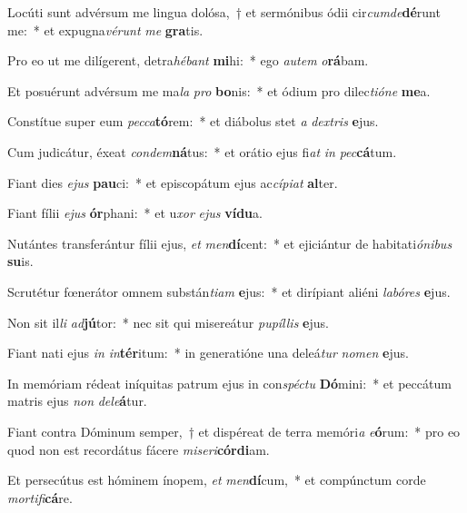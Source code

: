 \item Locúti sunt advérsum me lingua dolósa,~† et sermónibus ódii cir\textit{cum}\textit{de}\textbf{dé}runt me:~* et expugna\textit{vé}\textit{runt} \textit{me} \textbf{gra}tis.
\item Pro eo ut me dilígerent, detra\textit{hé}\textit{bant} \textbf{mi}hi:~* ego \textit{au}\textit{tem} \textit{o}\textbf{rá}bam.
\item Et posuérunt advérsum me ma\textit{la} \textit{pro} \textbf{bo}nis:~* et ódium pro dilec\textit{ti}\textit{ó}\textit{ne} \textbf{me}a.
\item Constítue super eum \textit{pec}\textit{ca}\textbf{tó}rem:~* et diábolus stet \textit{a} \textit{dex}\textit{tris} \textbf{e}jus.
\item Cum judicátur, éxeat \textit{con}\textit{dem}\textbf{ná}tus:~* et orátio ejus fi\textit{at} \textit{in} \textit{pec}\textbf{cá}tum.
\item Fiant dies \textit{e}\textit{jus} \textbf{pau}ci:~* et episcopátum ejus ac\textit{cí}\textit{pi}\textit{at} \textbf{al}ter.
\item Fiant fílii \textit{e}\textit{jus} \textbf{ór}phani:~* et u\textit{xor} \textit{e}\textit{jus} \textbf{ví}\textbf{du}a.
\item Nutántes transferántur fílii ejus, \textit{et} \textit{men}\textbf{dí}cent:~* et ejiciántur de habitati\textit{ó}\textit{ni}\textit{bus} \textbf{su}is.
\item Scrutétur fœnerátor omnem substán\textit{ti}\textit{am} \textbf{e}jus:~* et dirípiant aliéni \textit{la}\textit{bó}\textit{res} \textbf{e}jus.
\item Non sit il\textit{li} \textit{ad}\textbf{jú}tor:~* nec sit qui misereátur \textit{pu}\textit{píl}\textit{lis} \textbf{e}jus.
\item Fiant nati ejus \textit{in} \textit{in}\textbf{tér}itum:~* in generatióne una deleá\textit{tur} \textit{no}\textit{men} \textbf{e}jus.
\item In memóriam rédeat iníquitas patrum ejus in con\textit{spéc}\textit{tu} \textbf{Dó}mini:~* et peccátum matris ejus \textit{non} \textit{de}\textit{le}\textbf{á}tur.
\item Fiant contra Dóminum semper,~† et dispéreat de terra memóri\textit{a} \textit{e}\textbf{ó}rum:~* pro eo quod non est recordátus fácere \textit{mi}\textit{se}\textit{ri}\textbf{cór}\textbf{di}am.
\item Et persecútus est hóminem ínopem, \textit{et} \textit{men}\textbf{dí}cum,~* et compúnctum corde \textit{mor}\textit{ti}\textit{fi}\textbf{cá}re.
